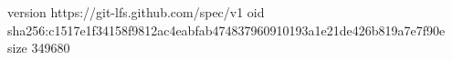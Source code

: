 version https://git-lfs.github.com/spec/v1
oid sha256:c1517e1f34158f9812ac4eabfab474837960910193a1e21de426b819a7e7f90e
size 349680
